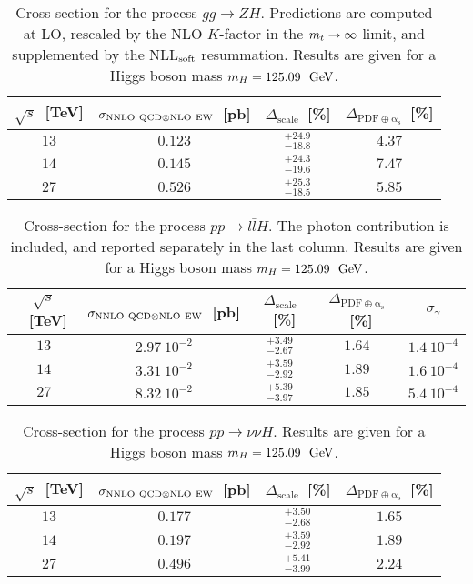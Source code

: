 \begin{table}
\centering
\begin{tabular}{cccc}
\toprule
$\sqrt{s}$~[TeV] & $\sigma_{{\rm NNLO~QCD}\otimes{\rm NLO~EW}}$~[pb] & $\Delta_{\mathrm{scale}}$~[\%] &
$\Delta_{\mathrm{PDF\oplus\alpha_s}}$~[\%] \\
\midrule
$13$ & $0.123$ & $^{+24.9}_{-18.8}$ & $4.37$ \\
$14$ & $0.145$ & $^{+24.3}_{-19.6}$ & $7.47$ \\
$27$ & $0.526$ & $^{+25.3}_{-18.5}$ & $5.85$ \\
\bottomrule
\end{tabular}
\caption{Cross-section for the process $g g  \to ZH$. Predictions are computed 
at LO, rescaled by the NLO $K$-factor in the $m_t \to \infty$ limit,
and supplemented by the NLL$_{\rm soft}$ resummation. Results are given for a Higgs boson mass $m_H = 125.09~{\rm ~\text{GeV}}$.}
\label{tab:ggZH_xsec}
\end{table}

\begin{table}
\centering
\begin{tabular}{cccc|c}
\toprule
$\sqrt{s}$~[TeV] & $\sigma_{{\rm NNLO~QCD}\otimes{\rm NLO~EW}}$~[pb] & $\Delta_{\mathrm{scale}}$~[\%] &
$\Delta_{\mathrm{PDF\oplus\alpha_s}}$~[\%] & $\sigma_{\gamma}$\\
\midrule
$13$ & $2.97~10^{-2}$ & $^{+3.49}_{-2.67}$ & $1.64$ & $1.4~10^{-4}$\\
$14$ & $3.31~10^{-2}$ & $^{+3.59}_{-2.92}$ & $1.89$ & $1.6~10^{-4}$\\
$27$ & $8.32~10^{-2}$ & $^{+5.39}_{-3.97}$ & $1.85$ & $5.4~10^{-4}$\\
\bottomrule
\end{tabular}
\caption{Cross-section for the process $p p   \to l\bar lH$. The photon contribution is included,
and reported separately in the last column.  Results are given for a Higgs boson mass $m_H = 125.09~{\rm ~\text{GeV}}$.}
\label{tab:llZH_xsec}
\end{table}

\begin{table}
\centering
\begin{tabular}{cccc}
\toprule
$\sqrt{s}$~[TeV] & $\sigma_{{\rm NNLO~QCD}\otimes{\rm NLO~EW}}$~[pb] & $\Delta_{\mathrm{scale}}$~[\%] &
$\Delta_{\mathrm{PDF\oplus\alpha_s}}$~[\%] \\
\midrule
$13$ & $0.177$ & $^{+3.50}_{-2.68}$ & $1.65$ \\
$14$ & $0.197$ & $^{+3.59}_{-2.92}$ & $1.89$ \\
$27$ & $0.496$ & $^{+5.41}_{-3.99}$ & $2.24$ \\
\bottomrule
\end{tabular}
\caption{Cross-section for the process $p p   \to \nu\bar \nu H$. Results are given for a Higgs boson mass $m_H = 125.09~{\rm ~\text{GeV}}$.}
\label{tab:nnZH_xsec}
\end{table}



